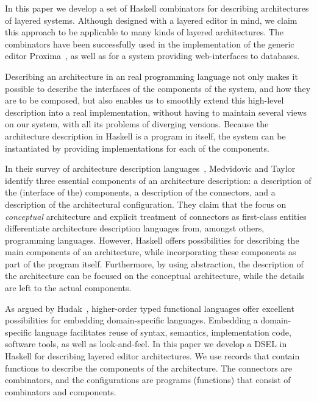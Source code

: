\documentclass[preprint,natbib]{sigplanconf}
\begin{document}
In this paper we develop a set of Haskell combinators for describing architectures of layered systems. Although designed with a layered editor in mind, we claim this approach to be applicable to many kinds of layered architectures. The combinators have been successfully used in the implementation of the generic editor Proxima~\cite{Schrage04Proxima}, as well as for a system providing web-interfaces to databases. 

Describing an architecture in an real programming language not only makes it possible to describe the interfaces of the components of the system, and how they are to be composed, but also enables us to smoothly extend this high-level description into a real implementation, without having to maintain several views on our system, with all its problems of diverging versions. Because the architecture description in Haskell is a program in itself, the system can be instantiated by providing implementations for each of the components.

In their survey of architecture description languages~\cite{medvidovic00ADLs}, Medvidovic and Taylor identify three essential components of an architecture description: a description of the (interface of the) components, a description of the connectors, and a description of the architectural configuration. They claim that the focus on {\em conceptual} architecture and explicit treatment of connectors as first-class entities differentiate architecture description languages from, amongst others, programming languages. However, Haskell offers possibilities for describing the main components of an architecture, while incorporating  these components as part of the program itself. Furthermore, by using abstraction, the description of the architecture can be focused on the conceptual architecture, while the details are left to the actual components.

As argued by Hudak~\cite{hudak98DSLs}, higher-order typed functional languages offer excellent possibilities for embedding domain-specific languages. Embedding a domain-specific language facilitates reuse of syntax, semantics, implementation code, software tools, as well as look-and-feel. In this paper we develop a DSEL in Haskell for describing layered editor architectures. We use records that contain functions to describe the components of the architecture. The connectors are combinators, and the configurations are programs (functions) that consist of combinators and components. 
\end{document}
